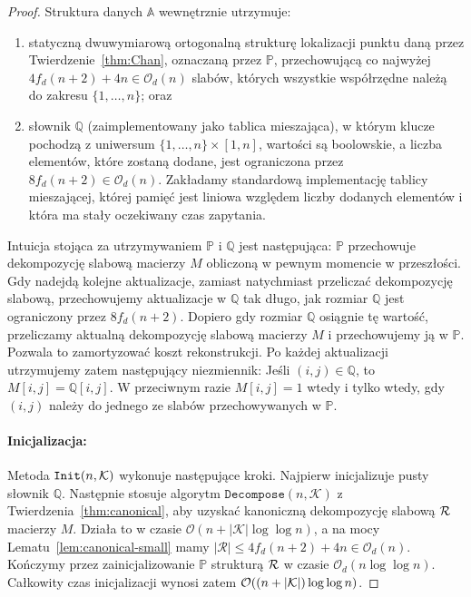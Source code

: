 \documentclass[runningheads]{llncs}
\newcommand{\Oh}{\mathcal{O}}
\renewcommand{\leq}{\leqslant}
\begin{document}
\begin{proof}
Struktura danych $\mathbb{A}$ wewnętrznie utrzymuje:
\begin{enumerate}
 \item statyczną dwuwymiarową ortogonalną strukturę lokalizacji punktu daną przez Twierdzenie~\ref{thm:Chan}, oznaczaną przez $\mathbb{P}$, przechowującą co najwyżej
 $4 f_d(n+2)+4n \in \Oh_d(n)$ slabów, których wszystkie współrzędne należą do zakresu
 $\{ 1, \ldots, n \}$; oraz
 \item słownik $\mathbb{Q}$ (zaimplementowany jako tablica mieszająca), w którym
 klucze pochodzą
 z uniwersum
 $\{1, \ldots, n \}\times [1,n]$, wartości są
 boolowskie,
 a liczba elementów, które zostaną dodane, jest ograniczona przez
 $8 f_d(n+2) \in \Oh_d(n)$. Zakładamy standardową implementację
 tablicy
 mieszającej, której pamięć jest liniowa względem liczby dodanych elementów
 i która ma stały oczekiwany czas zapytania.
\end{enumerate}

Intuicja stojąca za utrzymywaniem $\mathbb{P}$ i $\mathbb{Q}$
jest następująca: $\mathbb{P}$ przechowuje dekompozycję slabową macierzy $M$
obliczoną w pewnym momencie w przeszłości. Gdy nadejdą kolejne aktualizacje,
zamiast natychmiast przeliczać dekompozycję slabową,
przechowujemy aktualizacje w $\mathbb{Q}$ tak długo, jak rozmiar
$\mathbb{Q}$ jest ograniczony przez $8 f_d(n+2)$. Dopiero gdy rozmiar
$\mathbb{Q}$ osiągnie tę wartość, przeliczamy aktualną
dekompozycję slabową
macierzy $M$ i przechowujemy ją w $\mathbb{P}$. Pozwala to
zamortyzować koszt rekonstrukcji.
Po każdej aktualizacji utrzymujemy zatem następujący niezmiennik:
Jeśli $(i, j) \in \mathbb{Q}$, to $M[i, j] = \mathbb{Q}[i, j]$.
W przeciwnym razie $M[i, j]=1$ wtedy i tylko wtedy, gdy $(i, j)$ należy do jednego ze
slabów przechowywanych w $\mathbb{P}$.

\paragraph*{Inicjalizacja:} Metoda $\mathtt{Init}(n, \cal K)$ wykonuje następujące kroki.
Najpierw inicjalizuje pusty słownik $\mathbb{Q}$. Następnie
stosuje algorytm $\mathtt{Decompose}(n,\mathcal{K})$ z Twierdzenia~\ref{thm:canonical}, aby uzyskać kanoniczną
dekompozycję slabową $\cal R$ macierzy $M$. Działa to w czasie
$\Oh(n+|\mathcal{K}| \log \log n)$, a na mocy
Lematu~\ref{lem:canonical-small} mamy $|\mathcal{R}| \leq 4 f_d(n+2)+4n \in \Oh_d(n)$.
Kończymy przez zainicjalizowanie
$\mathbb{P}$ strukturą $\cal R$ w czasie $\Oh_d(n \log \log n)$.
Całkowity czas inicjalizacji wynosi zatem
$\Oh((n + |{\cal K}|) \log \log n)$.


\end{proof}
\end{document}
